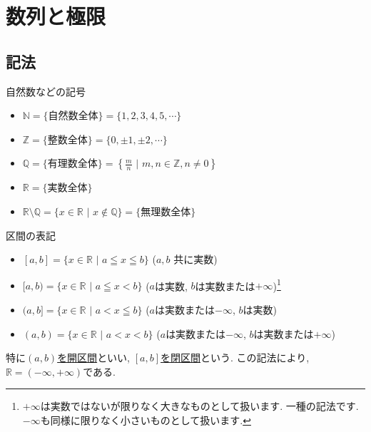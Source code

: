 \documentclass[dvipdfmx,a4paper,11pt]{article}
\newcommand{\R}{\mathbb{R}}
\newcommand{\Z}{\mathbb{Z}}
\newcommand{\Q}{\mathbb{Q}}
\newcommand{\N}{\mathbb{N}}
\theoremstyle{definition}
\begin{document}
\newpage 


\section{数列と極限}
\label{sec-1}
\subsection{記法}

\hspace{16pt}自然数などの記号

\begin{itemize}
  \setlength{\parskip}{0cm} 
  \setlength{\itemsep}{0cm}
\item $\N =\{ \text{自然数全体}\} = \{ 1,2,3,4,5,\cdots\}$
\item $\Z =\{ \text{整数全体}\} = \{ 0, \pm1, \pm 2,\cdots\}$
\item $\Q =\{ \text{有理数全体} \} = \left\{ \frac{m}{n} \,\,|\,\,  m,n \in \Z , n \neq 0 \right\}$
\item $\R =\{ \text{実数全体}\} $
\item $\R \setminus \Q=\{ x \in \R \,\, | \,\, x \not \in \Q\} = \{ \text{無理数全体}\} $
\end{itemize}

区間の表記

\begin{itemize}
  \setlength{\parskip}{0cm} 
  \setlength{\itemsep}{0cm}
\item $ [a,b] = \{ x \in \R \,\,| \,\, a \leqq x \leqq b\}$ ($a,b$ 共に実数)
\item $ [a,b) = \{ x \in \R \,\,| \,\, a \leqq x < b\}$ ($a$は実数, $b$は実数または$+\infty$)\footnote{$+ \infty$は実数ではないが限りなく大きなものとして扱います. 一種の記法です. $- \infty$も同様に限りなく小さいものとして扱います.}
\item $ (a,b] = \{ x \in \R \,\,| \,\, a < x \leqq b\}$ ($a$は実数または$-\infty$, $b$は実数)
\item $ (a,b) = \{ x \in \R \,\,| \,\, a < x < b\}$ ($a$は実数または$-\infty$, $b$は実数または$+\infty$)
\end{itemize}

特に\underline{$(a,b)$を開区間}といい, \underline{$ [a,b]$を閉区間}という.
この記法により, $\R = (- \infty, + \infty)$である.
\end{document}
